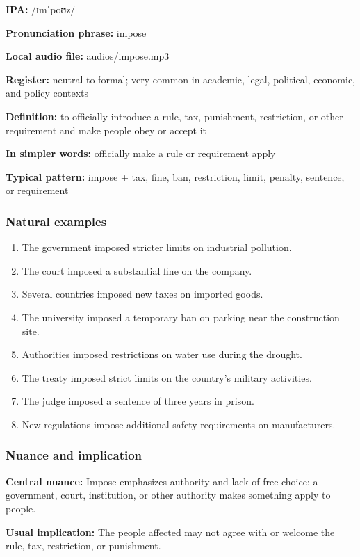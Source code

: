 \documentclass[11pt]{article}
\begin{document}
\textbf{IPA:} /ɪmˈpoʊz/

\textbf{Pronunciation phrase:} impose

\textbf{Local audio file:} audios/impose.mp3

\textbf{Register:} neutral to formal; very common in academic, legal, political, economic, and policy contexts

\textbf{Definition:} to officially introduce a rule, tax, punishment, restriction, or other requirement and make people obey or accept it

\textbf{In simpler words:} officially make a rule or requirement apply

\textbf{Typical pattern:} impose + tax, fine, ban, restriction, limit, penalty, sentence, or requirement

\subsubsection{Natural examples}
\begin{enumerate}
  \item The government imposed stricter limits on industrial pollution.
  \item The court imposed a substantial fine on the company.
  \item Several countries imposed new taxes on imported goods.
  \item The university imposed a temporary ban on parking near the construction site.
  \item Authorities imposed restrictions on water use during the drought.
  \item The treaty imposed strict limits on the country's military activities.
  \item The judge imposed a sentence of three years in prison.
  \item New regulations impose additional safety requirements on manufacturers.
\end{enumerate}

\subsubsection{Nuance and implication}
\textbf{Central nuance:} Impose emphasizes authority and lack of free choice: a government, court, institution, or other authority makes something apply to people.

\textbf{Usual implication:} The people affected may not agree with or welcome the rule, tax, restriction, or punishment.
\end{document}
